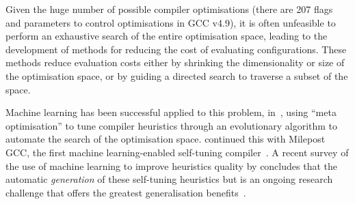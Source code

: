 Given the huge number of possible compiler optimisations (there are
207 flags and parameters to control optimisations in GCC v4.9), it is
often unfeasible to perform an exhaustive search of the entire
optimisation space, leading to the development of methods for reducing
the cost of evaluating configurations. These methods reduce evaluation
costs either by shrinking the dimensionality or size of the
optimisation space, or by guiding a directed search to traverse a
subset of the space.

Machine learning has been successful applied to this problem,
in~\cite{Stephenson2003}, using ``meta optimisation'' to tune compiler
heuristics through an evolutionary algorithm to automate the search of
the optimisation space. \citeauthor{Fursin2011} continued this with
Milepost GCC, the first machine learning-enabled self-tuning
compiler~\cite{Fursin2011}. A recent survey of the use of machine
learning to improve heuristics quality by \citeauthor{Burke2013}
concludes that the automatic \emph{generation} of these self-tuning
heuristics but is an ongoing research challenge that offers the
greatest generalisation benefits~\cite{Burke2013}.





